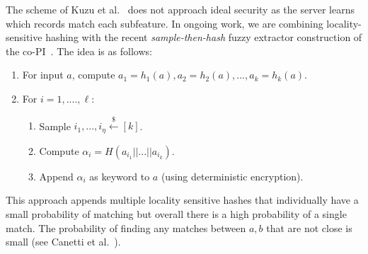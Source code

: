 The scheme of Kuzu et al.~\cite{kuzu2012efficient}  does not approach ideal security as the server learns which records match each subfeature.  In ongoing work, we are combining locality-sensitive hashing with the recent \emph{sample-then-hash} fuzzy extractor construction of the co-PI~\cite{EC:CFPRS16}.  The idea is as follows:

\begin{enumerate}\setlength\itemsep{0em}
\item For input $a$, compute $a_1 = h_1(a), a_2 = h_2(a),..., a_k = h_k(a)$.
\item For $i=1,...., \ell$:
\begin{enumerate}\setlength\itemsep{0em}
\item Sample $i_1,..., i_\eta\overset{\$}\leftarrow [k]$.
\item Compute $\alpha_i = H(a_{i_1} || ... || a_{i_k})$.
\item Append $\alpha_i$ as keyword to $a$ (using deterministic encryption).
\end{enumerate}
\end{enumerate}
\noindent
This approach appends multiple locality sensitive hashes that individually have a small probability of matching but overall there is a high probability of a single match.  The probability of finding any matches between $a,b$ that are not close is small (see Canetti et al.~\cite{EC:CFPRS16}).
%
